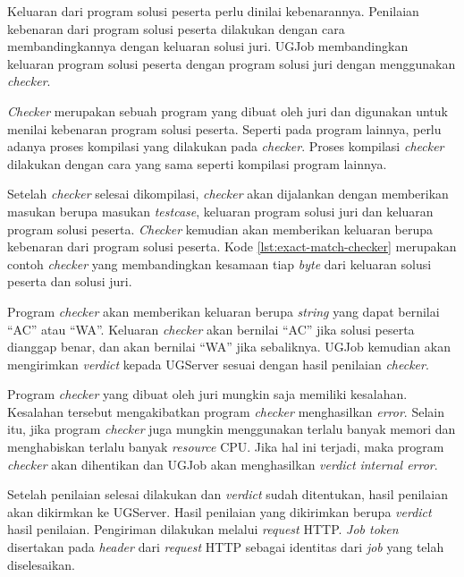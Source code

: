 \par Keluaran dari program solusi peserta perlu dinilai kebenarannya. Penilaian kebenaran dari program solusi peserta dilakukan dengan cara membandingkannya dengan keluaran solusi juri. UGJob membandingkan keluaran program solusi peserta dengan program solusi juri dengan menggunakan \textit{checker}.

\par \textit{Checker} merupakan sebuah program yang dibuat oleh juri dan digunakan untuk menilai kebenaran program solusi peserta. Seperti pada program lainnya, perlu adanya proses kompilasi yang dilakukan pada \textit{checker}. Proses kompilasi \textit{checker} dilakukan dengan cara yang sama seperti kompilasi program lainnya.



\par Setelah \textit{checker} selesai dikompilasi, \textit{checker} akan dijalankan dengan memberikan masukan berupa masukan \textit{testcase}, keluaran program solusi juri dan keluaran program solusi peserta. \textit{Checker} kemudian akan memberikan keluaran berupa kebenaran dari program solusi peserta. Kode \ref{lst:exact-match-checker} merupakan contoh \textit{checker} yang membandingkan kesamaan tiap \textit{byte} dari keluaran solusi peserta dan solusi juri.

\par Program \textit{checker} akan memberikan keluaran berupa \textit{string} yang dapat bernilai ``AC'' atau ``WA''. Keluaran \textit{checker} akan bernilai ``AC'' jika solusi peserta dianggap benar, dan akan bernilai ``WA'' jika sebaliknya. UGJob kemudian akan mengirimkan \textit{verdict} kepada UGServer sesuai dengan hasil penilaian \textit{checker}.

\par Program \textit{checker} yang dibuat oleh juri mungkin saja memiliki kesalahan. Kesalahan tersebut mengakibatkan program \textit{checker} menghasilkan \textit{error}. Selain itu, jika program \textit{checker} juga mungkin menggunakan terlalu banyak memori dan menghabiskan terlalu banyak \textit{resource} CPU. Jika hal ini terjadi, maka program \textit{checker} akan dihentikan dan UGJob akan menghasilkan \textit{verdict} \textit{internal error}.

\par Setelah penilaian selesai dilakukan dan \textit{verdict} sudah ditentukan, hasil penilaian akan dikirmkan ke UGServer. Hasil penilaian yang dikirimkan berupa \textit{verdict} hasil penilaian. Pengiriman dilakukan melalui \textit{request} HTTP. \textit{Job token} disertakan pada \textit{header} dari \textit{request} HTTP sebagai identitas dari \textit{job} yang telah diselesaikan.

